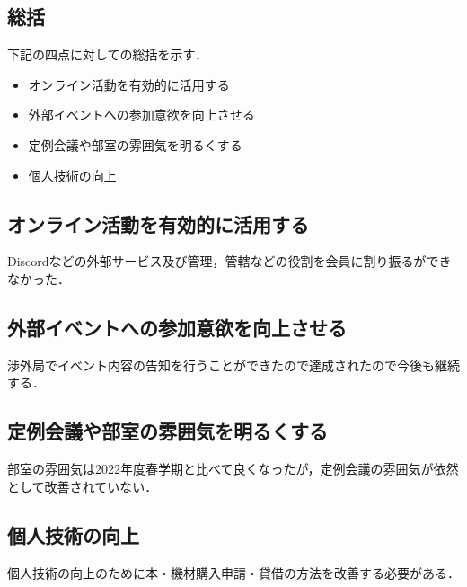 \subsection*{\secondGrade{}総括}


下記の四点に対しての総括を示す．
\begin{itemize}
    \item オンライン活動を有効的に活用する
    \item 外部イベントへの参加意欲を向上させる
    \item 定例会議や部室の雰囲気を明るくする
    \item 個人技術の向上
\end{itemize}

\subsection*{オンライン活動を有効的に活用する}
Discordなどの外部サービス及び管理，管轄などの役割を会員に割り振るができなかった．

\subsection*{外部イベントへの参加意欲を向上させる}
渉外局でイベント内容の告知を行うことができたので達成されたので今後も継続する．

\subsection*{定例会議や部室の雰囲気を明るくする}
部室の雰囲気は2022年度春学期と比べて良くなったが，定例会議の雰囲気が依然として改善されていない．

\subsection*{個人技術の向上}
個人技術の向上のために本・機材購入申請・貸借の方法を改善する必要がある．